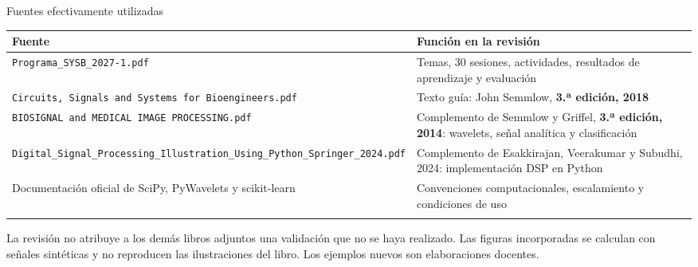 \documentclass[
  10pt,
  ignorenonframetext,
  aspectratio=169,
  spanish,
]{beamer}
\begin{document}
\begin{frame}[fragile]{Fuentes efectivamente utilizadas}
\label{fuentes-efectivamente-utilizadas}
\begin{longtable}[]{@{}
  >{\raggedright\arraybackslash}p{}
  >{\raggedright\arraybackslash}p{}@{}}
\toprule\noalign{}
\begin{minipage}[b]{\linewidth}\raggedright
Fuente
\end{minipage} & \begin{minipage}[b]{\linewidth}\raggedright
Función en la revisión
\end{minipage} \\
\midrule\noalign{}
\endhead
\texttt{Programa\_SYSB\_2027-1.pdf} & Temas, 30 sesiones, actividades,
resultados de aprendizaje y evaluación \\
\texttt{Circuits,\ Signals\ and\ Systems\ for\ Bioengineers.pdf} & Texto
guía: John Semmlow, \textbf{3.ª edición, 2018} \\
\texttt{BIOSIGNAL\ and\ MEDICAL\ IMAGE\ PROCESSING.pdf} & Complemento de
Semmlow y Griffel, \textbf{3.ª edición, 2014}: wavelets, señal analítica
y clasificación \\
\texttt{Digital\_Signal\_Processing\_Illustration\_Using\_Python\_Springer\_2024.pdf}
& Complemento de Esakkirajan, Veerakumar y Subudhi, 2024: implementación
DSP en Python \\
Documentación oficial de SciPy, PyWavelets y scikit-learn & Convenciones
computacionales, escalamiento y condiciones de uso \\
\bottomrule\noalign{}
\end{longtable}

La revisión no atribuye a los demás libros adjuntos una validación que
no se haya realizado. Las figuras incorporadas se calculan con señales
sintéticas y no reproducen las ilustraciones del libro. Los ejemplos
nuevos son elaboraciones docentes.


\end{frame}
\end{document}
